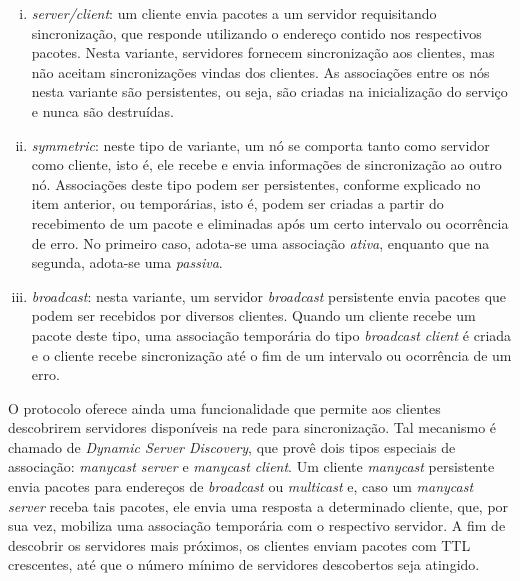 \begin {enumerate}[i.]
  
  \item \textit{server/client}: um cliente envia pacotes a um servidor
  requisitando sincronização, que responde utilizando o endereço contido nos
  respectivos pacotes. Nesta variante, servidores fornecem sincronização aos
  clientes, mas não aceitam sincronizações vindas dos clientes. As associações
  entre os nós nesta variante são persistentes, ou seja, são criadas na
  inicialização do serviço e nunca são destruídas.
  
  \item \textit{symmetric}: neste tipo de variante, um nó se comporta tanto como
  servidor como cliente, isto é, ele recebe e envia informações de sincronização
  ao outro nó. Associações deste tipo podem ser persistentes, conforme explicado
  no item anterior, ou temporárias, isto é, podem ser criadas a partir do
  recebimento de um pacote e eliminadas após um certo intervalo ou ocorrência
  de erro. No primeiro caso, adota-se uma associação \textit{ativa}, enquanto
  que na segunda, adota-se uma \textit{passiva}.
      
  \item \textit{broadcast}: nesta variante, um servidor \textit{broadcast}
  persistente envia pacotes que podem ser recebidos por diversos clientes.
  Quando um cliente recebe um pacote deste tipo, uma associação temporária do
  tipo \textit{broadcast client} é criada e o cliente recebe sincronização até o
  fim de um intervalo ou ocorrência de um erro.
  
\end{enumerate}

O protocolo oferece ainda uma funcionalidade que permite aos clientes
descobrirem servidores disponíveis na rede para sincronização. Tal mecanismo é
chamado de \textit{Dynamic Server Discovery}, que provê dois tipos especiais de
associação: \textit{manycast server} e \textit{manycast client}. Um cliente
\textit{manycast} persistente envia pacotes para endereços de \textit{broadcast}
ou \textit{multicast} e, caso um \textit{manycast server} receba tais pacotes,
ele envia uma resposta a determinado cliente, que, por sua vez, mobiliza uma
associação temporária com o respectivo servidor. A fim de descobrir os
servidores mais próximos, os clientes enviam pacotes com TTL crescentes, até que
o número mínimo de servidores descobertos seja atingido.

\vspace{12pt}

